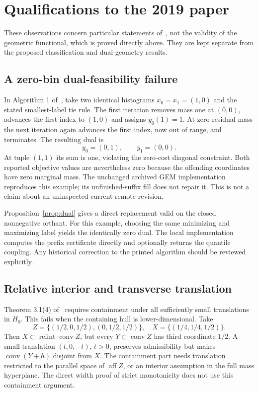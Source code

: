 \documentclass[11pt]{article}
\theoremstyle{definition}\newtheorem{definition}[theorem]{Definition}
\newcommand{\1}{\mathbf 1}
\newcommand{\conv}{\operatorname{conv}}
\newcommand{\aff}{\operatorname{aff}}
\newcommand{\relint}{\operatorname{relint}}
\begin{document}
\clearpage
\appendix
\section{Qualifications to the 2019 paper}
These observations concern particular statements of~\cite{kline}, not the
validity of the geometric functional, which is proved directly above. They are
kept separate from the proposed classification and dual-geometry results.

\subsection{A zero-bin dual-feasibility failure}
In Algorithm 1 of~\cite[p.136]{kline}, take two identical histograms
$x_0=x_1=(1,0)$ and the stated smallest-label tie rule. The first iteration
removes mass one at $(0,0)$, advances the first index to $(1,0)$ and assigns
$y_0(1)=1$. At zero residual mass the next iteration again advances the first
index, now out of range, and terminates. The resulting dual is
\[
 y_0=(0,1),\qquad y_1=(0,0).
\]
At tuple $(1,1)$ its sum is one, violating the zero-cost diagonal constraint.
Both reported objective values are nevertheless zero because the offending
coordinates have zero marginal mass. The unchanged archived GEM implementation
reproduces this example; its unfinished-suffix fill does not repair it. This
is not a claim about an uninspected current remote revision.

Proposition~\ref{prop:dual} gives a direct replacement valid on the closed
nonnegative orthant. For this example, choosing the same minimizing and maximizing
label yields the identically zero dual. The local implementation computes the
prefix certificate directly and optionally returns the quantile coupling. Any
historical correction to the printed algorithm should be reviewed explicitly.

\subsection{Relative interior and transverse translation}
Theorem 3.1(4) of~\cite[p.136]{kline} requires containment under all sufficiently
small translations in $H_0$. This fails when the containing hull is
lower-dimensional. Take
\[
 Z=\{(1/2,0,1/2),(0,1/2,1/2)\},\quad X=\{(1/4,1/4,1/2)\}.
\]
Then $X\subset\relint\conv Z$, but every $Y\subset\conv Z$ has third coordinate
$1/2$. A small translation $(t,0,-t)$, $t>0$, preserves admissibility but makes
$\conv(Y+h)$ disjoint from $X$. The containment part needs translation restricted
to the parallel space of $\aff Z$, or an interior assumption in the full
mass hyperplane. The direct width proof of strict monotonicity does not use
this containment argument.
\end{document}
